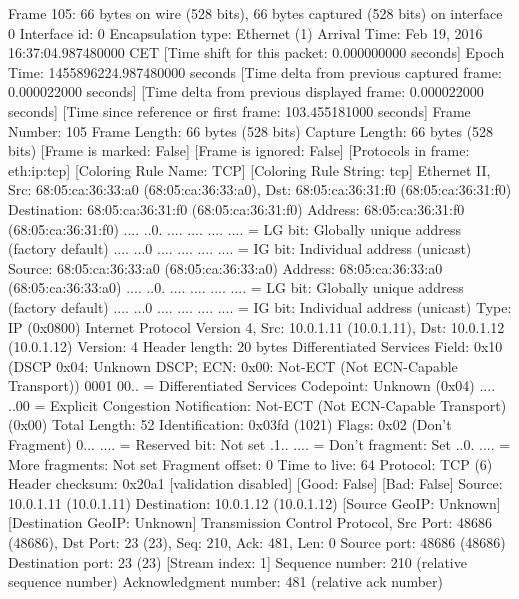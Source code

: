 Frame 105: 66 bytes on wire (528 bits), 66 bytes captured (528 bits) on interface 0
    Interface id: 0
    Encapsulation type: Ethernet (1)
    Arrival Time: Feb 19, 2016 16:37:04.987480000 CET
    [Time shift for this packet: 0.000000000 seconds]
    Epoch Time: 1455896224.987480000 seconds
    [Time delta from previous captured frame: 0.000022000 seconds]
    [Time delta from previous displayed frame: 0.000022000 seconds]
    [Time since reference or first frame: 103.455181000 seconds]
    Frame Number: 105
    Frame Length: 66 bytes (528 bits)
    Capture Length: 66 bytes (528 bits)
    [Frame is marked: False]
    [Frame is ignored: False]
    [Protocols in frame: eth:ip:tcp]
    [Coloring Rule Name: TCP]
    [Coloring Rule String: tcp]
Ethernet II, Src: 68:05:ca:36:33:a0 (68:05:ca:36:33:a0), Dst: 68:05:ca:36:31:f0 (68:05:ca:36:31:f0)
    Destination: 68:05:ca:36:31:f0 (68:05:ca:36:31:f0)
        Address: 68:05:ca:36:31:f0 (68:05:ca:36:31:f0)
        .... ..0. .... .... .... .... = LG bit: Globally unique address (factory default)
        .... ...0 .... .... .... .... = IG bit: Individual address (unicast)
    Source: 68:05:ca:36:33:a0 (68:05:ca:36:33:a0)
        Address: 68:05:ca:36:33:a0 (68:05:ca:36:33:a0)
        .... ..0. .... .... .... .... = LG bit: Globally unique address (factory default)
        .... ...0 .... .... .... .... = IG bit: Individual address (unicast)
    Type: IP (0x0800)
Internet Protocol Version 4, Src: 10.0.1.11 (10.0.1.11), Dst: 10.0.1.12 (10.0.1.12)
    Version: 4
    Header length: 20 bytes
    Differentiated Services Field: 0x10 (DSCP 0x04: Unknown DSCP; ECN: 0x00: Not-ECT (Not ECN-Capable Transport))
        0001 00.. = Differentiated Services Codepoint: Unknown (0x04)
        .... ..00 = Explicit Congestion Notification: Not-ECT (Not ECN-Capable Transport) (0x00)
    Total Length: 52
    Identification: 0x03fd (1021)
    Flags: 0x02 (Don't Fragment)
        0... .... = Reserved bit: Not set
        .1.. .... = Don't fragment: Set
        ..0. .... = More fragments: Not set
    Fragment offset: 0
    Time to live: 64
    Protocol: TCP (6)
    Header checksum: 0x20a1 [validation disabled]
        [Good: False]
        [Bad: False]
    Source: 10.0.1.11 (10.0.1.11)
    Destination: 10.0.1.12 (10.0.1.12)
    [Source GeoIP: Unknown]
    [Destination GeoIP: Unknown]
Transmission Control Protocol, Src Port: 48686 (48686), Dst Port: 23 (23), Seq: 210, Ack: 481, Len: 0
    Source port: 48686 (48686)
    Destination port: 23 (23)
    [Stream index: 1]
    Sequence number: 210    (relative sequence number)
    Acknowledgment number: 481    (relative ack number)
